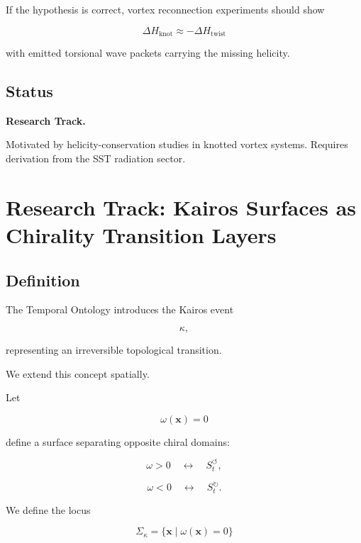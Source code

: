         If the hypothesis is correct, vortex reconnection experiments should show
        
        \[
            \Delta H_{\mathrm{knot}}
            \approx
            -
            \Delta H_{\mathrm{twist}}
        \]
        
        with emitted torsional wave packets carrying the missing helicity.
    
    \subsection{Status}
        
        \textbf{Research Track.}
        
        Motivated by helicity-conservation studies in knotted vortex systems.
        Requires derivation from the SST radiation sector.
    
    
    \section{Research Track: Kairos Surfaces as Chirality Transition Layers}
    
    \subsection{Definition}
        
        The Temporal Ontology introduces the Kairos event
        
        \[
            \kappa,
        \]
        
        representing an irreversible topological transition.
        
        We extend this concept spatially.
        
        Let
        
        \[
            \omega(\mathbf{x})=0
        \]
        
        define a surface separating opposite chiral domains:
        
        \[
            \omega>0
            \quad\leftrightarrow\quad
            S_t^{\circlearrowleft},
        \]
        
        \[
            \omega<0
            \quad\leftrightarrow\quad
            S_t^{\circlearrowright}.
        \]
        
        We define the locus
        
        \[
            \Sigma_\kappa
            =
            \{
            \mathbf{x}
            \;|\;
            \omega(\mathbf{x})=0
            \}
        \]
        
